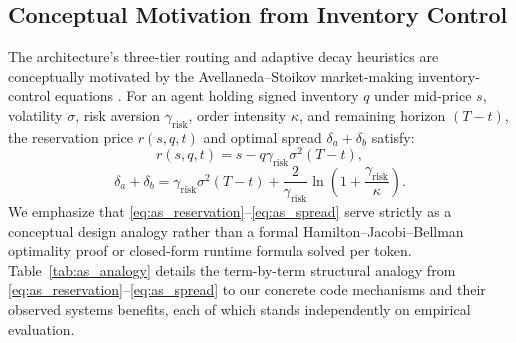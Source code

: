 \documentclass[conference]{IEEEtran}
\begin{document}
\subsection{Conceptual Motivation from Inventory Control}
The architecture's three-tier routing and adaptive decay heuristics are conceptually motivated by the Avellaneda--Stoikov market-making inventory-control equations \cite{b13}. For an agent holding signed inventory $q$ under mid-price $s$, volatility $\sigma$, risk aversion $\gamma_{\text{risk}}$, order intensity $\kappa$, and remaining horizon $(T - t)$, the reservation price $r(s, q, t)$ and optimal spread $\delta_a + \delta_b$ satisfy:
\begin{equation}
r(s, q, t) = s - q \gamma_{\text{risk}} \sigma^2 (T - t),
\label{eq:as_reservation}
\end{equation}
\begin{equation}
\delta_a + \delta_b = \gamma_{\text{risk}} \sigma^2 (T - t) + \frac{2}{\gamma_{\text{risk}}} \ln\!\left(1 + \frac{\gamma_{\text{risk}}}{\kappa}\right).
\label{eq:as_spread}
\end{equation}
We emphasize that \eqref{eq:as_reservation}--\eqref{eq:as_spread} serve strictly as a conceptual design analogy rather than a formal Hamilton--Jacobi--Bellman optimality proof or closed-form runtime formula solved per token. Table~\ref{tab:as_analogy} details the term-by-term structural analogy from \eqref{eq:as_reservation}--\eqref{eq:as_spread} to our concrete code mechanisms and their observed systems benefits, each of which stands independently on empirical evaluation.
\end{document}
